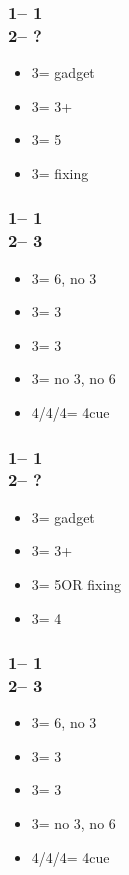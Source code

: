 \documentclass[12pt, a4paper]{article}
\begin{document}
\subsubsection*{1\diams -- 1\spades \\ 2\nt -- ?}
\begin{itemize}
    \item 3\clubs = gadget
    \item 3\diams = 3+\diams
    \item 3\hearts = 5\hearts
    \item 3\spades = fixing \spades
\end{itemize}

\subsubsection*{1\diams -- 1\spades \\ 2\nt -- 3\clubs}
\begin{itemize}
    \item 3\diams = 6\diams, no 3\spades
    \item 3\hearts = 3\diams
    \item 3\spades = 3\spades
    \item 3\nt = no 3\spades, no 6\diams
    \item 4\clubs/4\diams/4\hearts = 4\spades cue
\end{itemize}

\subsubsection*{1\diams -- 1\hearts \\ 2\nt -- ?}
\begin{itemize}
    \item 3\clubs = gadget
    \item 3\diams = 3+\diams
    \item 3\hearts = 5\hearts OR fixing \hearts
    \item 3\spades = 4\spades
\end{itemize}

\subsubsection*{1\clubs -- 1\hearts \\ 2\nt -- 3\clubs}
\begin{itemize}
    \item 3\diams = 6\diams, no 3
    \item 3\hearts = 3\hearts
    \item 3\spades = 3\diams
    \item 3\nt = no 3\hearts, no 6\diams
    \item 4\clubs/4\diams/4\hearts = 4\hearts cue
\end{itemize}

\end{document}
